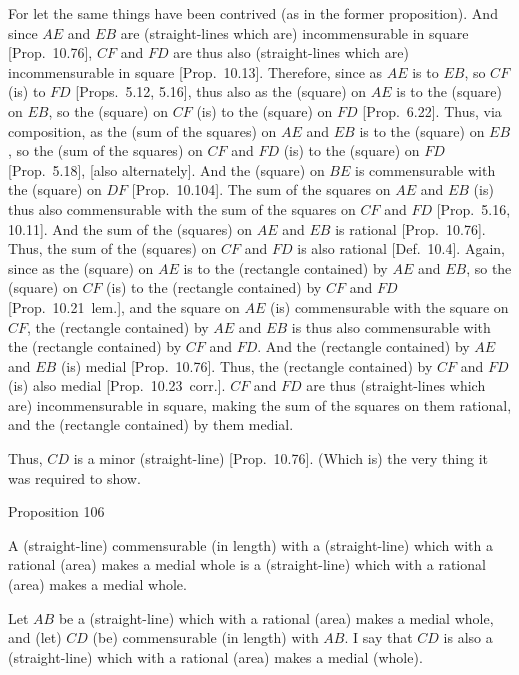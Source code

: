 For let the same things have been contrived (as in the former proposition).
And since $AE$ and $EB$ are (straight-lines which are) incommensurable in square [Prop.~10.76], $CF$ and $FD$ are thus also
(straight-lines which are)  incommensurable in square [Prop.~10.13].
Therefore, since as $AE$ is to $EB$, so $CF$ (is) to $FD$ [Props.~5.12, 5.16], thus also
as the (square) on $AE$ is to the (square) on $EB$, so the (square)
on $CF$ (is) to the (square) on $FD$ [Prop.~6.22]. Thus, via composition,
as the (sum of the squares) on $AE$ and $EB$ is to the (square) on $EB$,
so the (sum of the squares) on $CF$ and $FD$  (is) to the (square) on $FD$  [Prop.~5.18], [also alternately]. And the
(square) on $BE$ is commensurable with the (square) on $DF$ [Prop.~10.104]. The sum of the squares on $AE$ and $EB$ (is) thus also commensurable with the sum of the squares
on $CF$ and $FD$ [Prop.~5.16, 10.11].  And the sum of the (squares) on
$AE$ and $EB$ is rational [Prop.~10.76].
Thus, the sum of the (squares) on $CF$ and $FD$ is also rational
[Def.~10.4]. Again, since as the (square) on $AE$
is to the (rectangle contained) by $AE$ and $EB$, so
the (square) on $CF$ (is) to the (rectangle contained) by
$CF$ and $FD$ [Prop.~10.21~lem.],
and the square on $AE$ (is) commensurable with the square on
$CF$, the (rectangle contained) by $AE$ and $EB$ is thus also commensurable
with the (rectangle contained) by $CF$ and $FD$. And the
(rectangle contained) by $AE$ and $EB$ (is) medial [Prop.~10.76].  Thus, the (rectangle contained) by
$CF$ and $FD$ (is) also medial [Prop.~10.23~corr.]. $CF$ and $FD$
are thus (straight-lines which are) incommensurable in square, making the sum of the
squares on them rational, and the (rectangle contained) by them
medial.

Thus, $CD$ is a minor (straight-line) [Prop.~10.76]. (Which is) the very thing it
was required to show.


\begin{center}
{\large Proposition 106}
\end{center}

A (straight-line) commensurable (in length)
with a (straight-line) which with a rational (area) makes a medial
whole is a (straight-line) which with a rational (area) makes a medial
whole.

\epsfysize=0.7in
\centerline{}

Let $AB$ be a (straight-line) which with a rational (area) makes
a medial whole, and (let) $CD$ (be) commensurable
(in length) with $AB$. I say that $CD$ is also a (straight-line)
which with a rational (area) makes a medial (whole).

